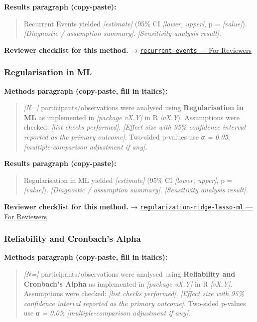 \documentclass[
]{article}
\begin{document}
\textbf{Results paragraph (copy-paste):}

\begin{quote}
Recurrent Events yielded \emph{{[}estimate{]}} (95\% CI \emph{{[}lower,
upper{]}}, p = \emph{{[}value{]}}). \emph{{[}Diagnostic / assumption
summary{]}}. \emph{{[}Sensitivity analysis result{]}}.
\end{quote}

\textbf{Reviewer checklist for this method.} →
\href{../chapters/11-survival/recurrent-events.Rmd\#for-reviewers}{\texttt{recurrent-events}
--- For Reviewers}

\subsubsection{Regularisation in ML}\label{regularisation-in-ml}

\textbf{Methods paragraph (copy-paste, fill in italics):}

\begin{quote}
\emph{{[}N={]}} participants/observations were analysed using
\textbf{Regularisation in ML} as implemented in \emph{{[}package
vX.Y{]}} in R \emph{{[}vX.Y{]}}. Assumptions were checked: \emph{{[}list
checks performed{]}}. \emph{{[}Effect size with 95\% confidence interval
reported as the primary outcome{]}}. Two-sided p-values use \emph{α =
0.05}; \emph{{[}multiple-comparison adjustment if any{]}}.
\end{quote}

\textbf{Results paragraph (copy-paste):}

\begin{quote}
Regularisation in ML yielded \emph{{[}estimate{]}} (95\% CI
\emph{{[}lower, upper{]}}, p = \emph{{[}value{]}}). \emph{{[}Diagnostic
/ assumption summary{]}}. \emph{{[}Sensitivity analysis result{]}}.
\end{quote}

\textbf{Reviewer checklist for this method.} →
\href{../chapters/13-ml/regularization-ridge-lasso-ml.Rmd\#for-reviewers}{\texttt{regularization-ridge-lasso-ml}
--- For Reviewers}

\subsubsection{Reliability and Cronbach's
Alpha}\label{reliability-and-cronbachs-alpha}

\textbf{Methods paragraph (copy-paste, fill in italics):}

\begin{quote}
\emph{{[}N={]}} participants/observations were analysed using
\textbf{Reliability and Cronbach's Alpha} as implemented in
\emph{{[}package vX.Y{]}} in R \emph{{[}vX.Y{]}}. Assumptions were
checked: \emph{{[}list checks performed{]}}. \emph{{[}Effect size with
95\% confidence interval reported as the primary outcome{]}}. Two-sided
p-values use \emph{α = 0.05}; \emph{{[}multiple-comparison adjustment if
any{]}}.
\end{quote}
\end{document}

